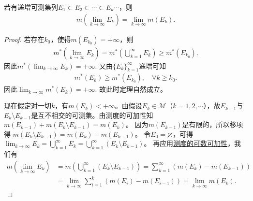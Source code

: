 \documentclass[../../main.tex]{subfiles}
\begin{document}
\begin{theorem}[递增可测集列的测度运算]\label{theorem:递增可测集列的测度运算}
若有递增可测集列$E_1\subset E_2\subset\cdots\subset E_k\cdots$，则
\begin{align}
m\left(\lim_{k\to\infty}E_k\right)=\lim_{k\to\infty}m(E_k).\label{eq:2.4}
\end{align}
\end{theorem}
\begin{proof}
若存在$k_0$，使得$m(E_{k_0})=+\infty$，则
\begin{align*}
m^*\left(\lim_{k\rightarrow \infty}E_k\right) = m^*\left(\bigcup_{k=1}^{\infty}E_k\right)\geqslant m^*(E_{k_0}).
\end{align*}
因此$m^*\left(\lim_{k\rightarrow \infty}E_k\right) = +\infty$. 又由$\{E_k\}_{k=1}^{\infty}$递增可知
\begin{align*}
m^*(E_k) \geqslant m^*(E_{k_0}), \quad \forall k \geqslant k_0.
\end{align*}
因此$\lim_{k\rightarrow \infty}m^*(E_k) = +\infty$.
故此时定理自然成立。

现在假定对一切$k$，有$m(E_k)<+\infty$。由假设$E_k\in\mathscr{M}$（$k = 1,2,\cdots$），故$E_{k - 1}$与$E_k\setminus E_{k - 1}$是互不相交的可测集。由测度的可加性知
$m(E_{k - 1})+m(E_k\setminus E_{k - 1})=m(E_k)$。
因为$m(E_{k - 1})$是有限的，所以移项得
$m(E_k\setminus E_{k - 1})=m(E_k)-m(E_{k - 1})$。
令$E_0 = \varnothing$，可得
$\lim_{k\to\infty}E_k=\bigcup_{k = 1}^{\infty}E_k=\bigcup_{k = 1}^{\infty}(E_k\setminus E_{k - 1})$。
再应用\hyperref[theorem:测度的基本性质]{测度的可数可加性}，我们有
\begin{align*}
m\left(\lim_{k\to\infty}E_k\right)&=m\left(\bigcup_{k = 1}^{\infty}(E_k\setminus E_{k - 1})\right)
=\sum_{k = 1}^{\infty}(m(E_k)-m(E_{k - 1}))\\
&=\lim_{k\to\infty}\sum_{i = 1}^{k}(m(E_i)-m(E_{i - 1}))
=\lim_{k\to\infty}m(E_k).
\end{align*}
\end{proof}
\end{document}
